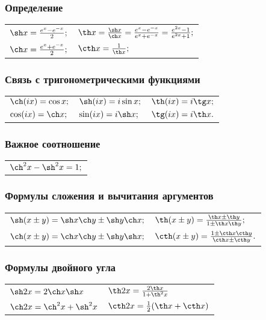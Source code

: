 \subsubsection{Определение}
\begin{tabular}{l l}
$\sh x = \frac{e^{x}-e^{-x}}{2};$
&
$\th x = \frac{\sh x}{\ch x}=\frac{e^{x}-e^{-x}}{e^{x}+e^{-x}}=\frac{e^{2x}-1}{e^{2x}+1};$
\\
$\ch x = \frac{e^{x}+e^{-x}}{2};$
&
$\cth x = \frac{1}{\th x};$
\end{tabular}

\subsubsection{Связь с тригонометрическими функциями}
\begin{tabular}{l l l}
$\ch (ix) = \cos x;$
&
$\sh (ix)= i \sin x;$
&
$\th (ix) = i \tg x;$
\\
$\cos (ix) = \ch x;$
&
$\sin (ix) = i \sh x;$
&
$\tg (ix) = i \th x.$
\end{tabular}

\subsubsection{Важное соотношение}
\begin{tabular}{l}
$\ch^2 x - \sh^2 x = 1;$
\end{tabular}

\subsubsection{Формулы сложения и вычитания аргументов}
\begin{tabular}{l l}
$\sh (x\pm y) =  \sh x \ch y \pm \sh y \ch x;$
&
$\th (x \pm y) = \frac{\th x \pm \th y}{1 \pm \th x \th y};$
\\
$\ch (x\pm y) =  \ch x \ch y \pm \sh y \sh x;$
&
$\cth (x \pm y) = \frac{1 \pm \cth x \cth y}{\cth x \pm \cth y}.$
\end{tabular}

\subsubsection{Формулы двойного угла}
\begin{tabular}{l l}
$\sh 2x = 2\ch x\sh x$
&
$\th 2x = \frac{2\th x}{1 + \th^2 x}$
\\
$\ch 2x = \ch^2 x + \sh^2 x$
&
$\cth 2x = \frac{1}{2}(\th x + \cth x)$
\end{tabular}

